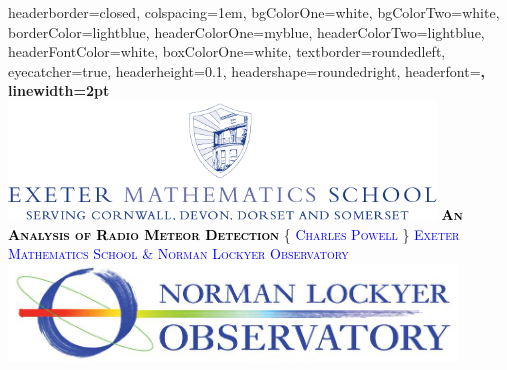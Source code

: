 \documentclass[landscape,a0paper,fontscale=0.400]{baposter} %
\begin{document}
\begin{poster}
{
headerborder=closed, %
colspacing=1em, %
bgColorOne=white, %
bgColorTwo=white, %
borderColor=lightblue, %
headerColorOne=myblue, %
headerColorTwo=lightblue, %
headerFontColor=white, %
boxColorOne=white, %
textborder=roundedleft, %
eyecatcher=true, %
headerheight=0.1\textheight, %
headershape=roundedright, %
headerfont=\Large\bf\textsc, %
linewidth=2pt %
}
%
{\includegraphics[height=8.5em]{logo2}} %
{\bf\textsc{\textcolor{black}{An Analysis of Radio Meteor Detection}}\vspace{0.5em}} %
{\textsc{\{ \textcolor{blue}{Charles Powell} \} \hspace{12pt} \textcolor{blue}{Exeter Mathematics School \& Norman Lockyer Observatory}}} %
{\includegraphics[height=7em]{nlo}} %


\end{poster}
\end{document}

